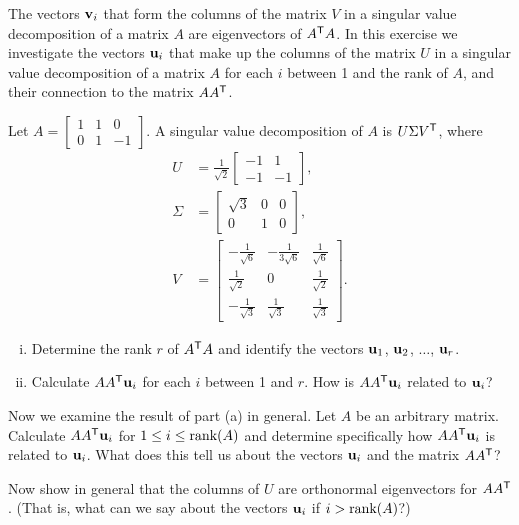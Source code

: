 \item \label{ex:7_c_AAT} The vectors $\mathbf{v}_i$ that form the columns of the matrix $V$ in a singular value decomposition of a matrix $A$ are eigenvectors of $A^{\mathsf{T}}A$. In this exercise we investigate the vectors $\mathbf{u}_i$ that make up the columns of the matrix $U$ in a singular value decomposition of a matrix $A$ for each $i$ between 1 and the rank of $A$, and their connection to the matrix $AA^{\mathsf{T}}$. 
	\ba
	\item Let $A = \left[ \begin{array}{ccr} 1&1&0 \\ 0&1&-1 \end{array} \right]$. A singular value decomposition of $A$ is $U \Sigma V^{\mathsf{T}}$, where 
	\begin{align*}
	U &= \frac{1}{\sqrt{2}}\left[ \begin{array}{rr} -1&1\\-1&-1 \end{array} \right], \\
	\Sigma &= \left[ \begin{array}{ccc} \sqrt{3}&0&0\\0&1&0 \end{array} \right], \\
	V &= \left[ \begin{array}{rcc} -\frac{1}{\sqrt{6}}&-\frac{1}{3\sqrt{6}}&\frac{1}{\sqrt{6}}\\ \frac{1}{\sqrt{2}}&0&\frac{1}{\sqrt{2}} \\  -\frac{1}{\sqrt{3}} & \frac{1}{\sqrt{3}} & \frac{1}{\sqrt{3}}\end{array} \right].
	\end{align*}
		\begin{enumerate}[i.]
		\item Determine the rank $r$ of $A^{\mathsf{T}}A$ and identify the vectors $\mathbf{u}_1$, $\mathbf{u}_2$, $\ldots$, $\mathbf{u}_r$. 
		\item Calculate $AA^{\mathsf{T}} \mathbf{u}_i$ for each $i$ between 1 and $r$. How is $AA^{\mathsf{T}} \mathbf{u}_i$ related to $\mathbf{u}_i$? 
		\end{enumerate}
	\item Now we examine the result of part (a) in general. Let $A$ be an arbitrary matrix. Calculate $AA^{\mathsf{T}} \mathbf{u}_i$ for $1 \leq i \leq \text{rank}(A)$ and determine specifically how $AA^{\mathsf{T}} \mathbf{u}_i$ is related to $\mathbf{u}_i$. What does this tell us about the vectors $\mathbf{u}_i$ and the matrix $AA^{\mathsf{T}}$? 


	\item Now show in general that the columns of $U$ are orthonormal eigenvectors for $AA^{\mathsf{T}}$. (That is, what can we say about the vectors $\mathbf{u}_i$ if $i > \text{rank}(A)$?) 
	

